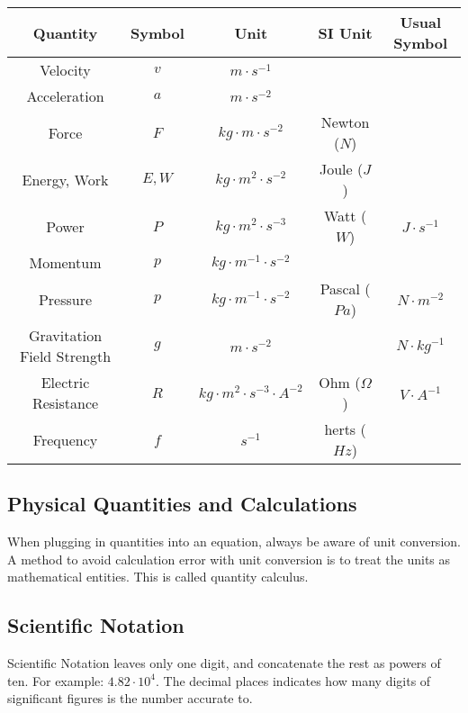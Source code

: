\documentclass[../notes.tex]{subfiles}
\begin{document}
\begin{center}
	\begin{tabular}{c c c c c}
		Quantity     & Symbol & Unit                        & SI Unit & Usual Symbol \\
		\hline
		Velocity     & $v$    & $m \cdot s^{-1}$                &               & \\
		Acceleration & $a$    & $m \cdot s^{-2}$                &               & \\
		Force        & $F$    & $kg \cdot m \cdot s^{-2}$       & Newton ($N$)  & \\
		Energy, Work & $E, W$ & $kg \cdot m^2 \cdot s^{-2}$     & Joule ($J$)         &  \\
		Power        & $P$    & $kg \cdot m^2 \cdot s^{-3}$     & Watt ($W$)    & $J \cdot s^{-1}$ \\
		Momentum     & $p$    & $kg \cdot m^{-1} \cdot s^{-2}$  &               & \\
		Pressure     & $p$    & $kg \cdot m^{-1} \cdot s^{-2} $ & Pascal ($Pa$) & $N \cdot m^{-2}$ \\
		Gravitation Field Strength & $g$ & $m \cdot s^{-2}$ & & $N \cdot kg^{-1}$ \\
		Electric Resistance & $R$ & $kg \cdot m^2 \cdot s^{-3} \cdot A^{-2}$ & Ohm ($\Omega$) & $V \cdot A^{-1}$ \\
		Frequency & $f$ & $s^{-1}$ & herts ($Hz$) & \\
	\end{tabular}
\end{center}

\subsection{Physical Quantities and Calculations}
When plugging in quantities into an equation, always be aware of unit conversion.
A method to avoid calculation error with unit conversion is to treat the units as mathematical entities.
This is called quantity calculus.

\subsection{Scientific Notation}
Scientific Notation leaves only one digit, and concatenate the rest as powers of ten.
For example: $4.82 \cdot 10^4$.
The decimal places indicates how many digits of significant figures is the number accurate to.
\end{document}
